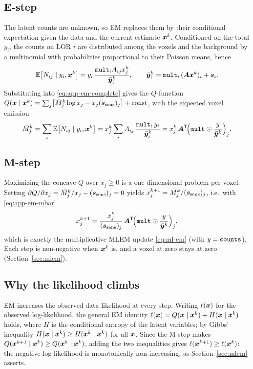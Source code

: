 \subsection*{E-step}

The latent counts are unknown, so EM replaces them by their conditional
expectation given the data and the current estimate $\bm{x}^k$. Conditioned on the
total $y_i$, the counts on LOR $i$ are distributed among the voxels and the
background by a multinomial with probabilities proportional to their Poisson
means, hence
\begin{equation}
  \mathbb E\bigl[N_{ij}\mid y_i,\bm{x}^k\bigr]
  = y_i\,\frac{\texttt{mult}_i A_{ij} x_j^k}{\bar{\bm{y}}_i^k},
  \qquad
  \bar{\bm{y}}_i^k=\texttt{mult}_i\,(\bm{A}\bm{x}^k)_i+\bm{s}_i .
  \label{eq:app-em-estep}
\end{equation}
Substituting into \eqref{eq:app-em-complete} gives the $Q$-function
$Q(\bm{x}\mid\bm{x}^k)=\sum_j\bigl[\bar M_j^k\log x_j - x_j(\bm{s}_{\mathrm{sens}})_j\bigr]+\text{const}$,
with the expected voxel emission
\begin{equation}
  \bar M_j^k
  = \sum_i \mathbb E\bigl[N_{ij}\mid y_i,\bm{x}^k\bigr]
  = x_j^k\sum_i A_{ij}\,\frac{\texttt{mult}_i\,y_i}{\bar{\bm{y}}_i^k}
  = x_j^k\,\bm{A}^{\mathsf{T}}\!\Bigl(\texttt{mult}\odot\frac{y}{\bar{\bm{y}}^k}\Bigr)_j .
  \label{eq:app-em-mbar}
\end{equation}

\subsection*{M-step}

Maximizing the concave $Q$ over $x_j\ge0$ is a one-dimensional problem per voxel.
Setting $\partial Q/\partial x_j = \bar M_j^k/x_j - (\bm{s}_{\mathrm{sens}})_j = 0$ yields
$x_j^{k+1}=\bar M_j^k/(\bm{s}_{\mathrm{sens}})_j$, i.e.\ with \eqref{eq:app-em-mbar}
\begin{equation}
  x_j^{k+1}
  = \frac{x_j^k}{(\bm{s}_{\mathrm{sens}})_j}\,
    \bm{A}^{\mathsf{T}}\!\Bigl(\texttt{mult}\odot\frac{y}{\bar{\bm{y}}^k}\Bigr)_j ,
  \label{eq:app-em-update}
\end{equation}
which is exactly the multiplicative MLEM update \eqref{eq:ml-em} (with $y=\texttt{counts}$).
Each step is non-negative when $\bm{x}^k$ is, and a voxel at zero stays at zero
(Section~\ref{sec:mlem}).

\subsection*{Why the likelihood climbs}

EM increases the observed-data likelihood at every step. Writing $\ell(\bm{x})$ for
the observed log-likelihood, the general EM identity
$\ell(\bm{x})=Q(\bm{x}\mid\bm{x}^k)+H(\bm{x}\mid\bm{x}^k)$ holds, where $H$ is the conditional
entropy of the latent variables; by Gibbs' inequality
$H(\bm{x}\mid\bm{x}^k)\ge H(\bm{x}^k\mid\bm{x}^k)$ for all $\bm{x}$. Since the M-step makes
$Q(\bm{x}^{k+1}\mid\bm{x}^k)\ge Q(\bm{x}^k\mid\bm{x}^k)$, adding the two inequalities gives
$\ell(\bm{x}^{k+1})\ge\ell(\bm{x}^k)$: the negative log-likelihood
 is monotonically non-increasing, as
Section~\ref{sec:mlem} asserts.

